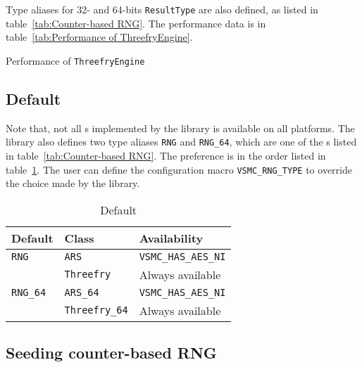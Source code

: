 Type aliases for 32- and 64-bits \verb|ResultType| are also defined, as listed
in table~\ref{tab:Counter-based RNG}. The performance data is in
table~\ref{tab:Performance of ThreefryEngine}.

\begin{table}
  \caption{Performance of \protect\texttt{ThreefryEngine}}
  \label{tab:Performance of ThreefryEngine}
\end{table}

\subsection{Default \protect\rng}
\label{sub:Default RNG}

Note that, not all \rng{}s implemented by the library is available on all
platforms. The library also defines two type aliases \verb|RNG| and
\verb|RNG_64|, which are one of the \rng{}s listed in
table~\ref{tab:Counter-based RNG}. The preference is in the order listed in
table~\ref{tab:Default RNG}. The user can define the configuration macro
\verb|VSMC_RNG_TYPE| to override the choice made by the library.

\begin{table}
  \begin{tabularx}{\textwidth}{XXX}
    \toprule
    Default  & Class & Availability \\
    \midrule
    \verb|RNG|    & \verb|ARS|         & \verb|VSMC_HAS_AES_NI| \\
                  & \verb|Threefry|    & Always available       \\
    \verb|RNG_64| & \verb|ARS_64|      & \verb|VSMC_HAS_AES_NI| \\
                  & \verb|Threefry_64| & Always available       \\
    \bottomrule
  \end{tabularx}
  \caption{Default \protect\rng}
  \label{tab:Default RNG}
\end{table}

\subsection{Seeding counter-based RNG}
\label{sub:Seeding counter-based RNG}

